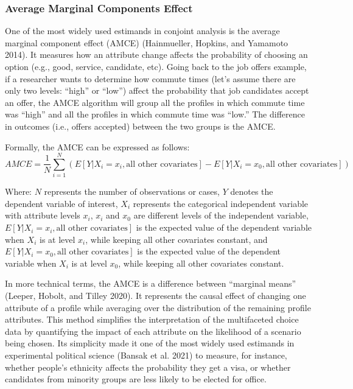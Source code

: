 \documentclass[
  12pt,
]{article}
\begin{document}
\hypertarget{average-marginal-components-effect}{%
\subsubsection{Average Marginal Components Effect}\label{average-marginal-components-effect}}

One of the most widely used estimands in conjoint analysis is the average marginal component effect (AMCE) (Hainmueller, Hopkins, and Yamamoto 2014). It measures how an attribute change affects the probability of choosing an option (e.g., good, service, candidate, etc). Going back to the job offers example, if a researcher wants to determine how commute times (let's assume there are only two levels: ``high'' or ``low'') affect the probability that job candidates accept an offer, the AMCE algorithm will group all the profiles in which commute time was ``high'' and all the profiles in which commute time was ``low.'' The difference in outcomes (i.e., offers accepted) between the two groups is the AMCE.

Formally, the AMCE can be expressed as follows:\[AMCE = \frac{1}{N} \sum_{i=1}^{N} (E[Y|X_i=x_i, \text{all other covariates}] - E[Y|X_i=x_0, \text{all other covariates}])\]

Where: \(N\) represents the number of observations or cases, \(Y\) denotes the dependent variable of interest, \(X_i\) represents the categorical independent variable with attribute levels \(x_i\), \(x_i\) and \(x_0\) are different levels of the independent variable, \(E[Y|X_i=x_i, \text{all other covariates}]\) is the expected value of the dependent variable when \(X_i\) is at level \(x_i\), while keeping all other covariates constant, and \(E[Y|X_i=x_0, \text{all other covariates}]\) is the expected value of the dependent variable when \(X_i\) is at level \(x_0\), while keeping all other covariates constant.

In more technical terms, the AMCE is a difference between ``marginal means'' (Leeper, Hobolt, and Tilley 2020). It represents the causal effect of changing one attribute of a profile while averaging over the distribution of the remaining profile attributes. This method simplifies the interpretation of the multifaceted choice data by quantifying the impact of each attribute on the likelihood of a scenario being chosen. Its simplicity made it one of the most widely used estimands in experimental political science (Bansak et al. 2021) to measure, for instance, whether people's ethnicity affects the probability they get a visa, or whether candidates from minority groups are less likely to be elected for office.
\end{document}
